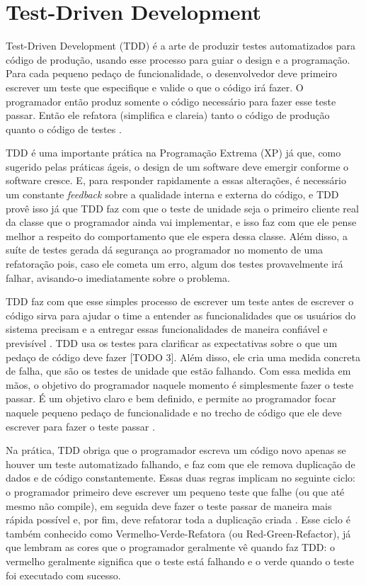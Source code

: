\chapter{Test-Driven Development}
\label{cap:tdd}

Test-Driven Development (TDD) é a arte de produzir testes automatizados para código de produção, usando
esse processo para guiar o design e a programação. Para cada pequeno pedaço de funcionalidade, o desenvolvedor
deve primeiro escrever um teste que especifique e valide o que o código irá fazer. O programador então produz
somente o código necessário para fazer esse teste passar. Então ele refatora (simplifica e clareia) tanto o
código de produção quanto o código de testes \cite{agilealliance-tdd} \cite{tdd-taxonomy}.

TDD é uma importante prática na Programação Extrema (XP) \cite{XPExplained} já que, como sugerido pelas práticas
ágeis, o design de um software deve emergir conforme o software cresce. E, para responder rapidamente a essas
alterações, é necessário um constante \textit{feedback} sobre a qualidade interna e externa do código, e TDD
provê isso já que TDD faz com que o teste de unidade seja o primeiro cliente real da classe que o programador ainda
vai implementar, e isso faz com que ele pense melhor a respeito do comportamento que ele espera dessa classe. Além disso,
a suíte de testes gerada dá segurança ao programador no momento de uma refatoração pois, caso ele cometa um erro,
algum dos testes provavelmente irá falhar, avisando-o imediatamente sobre o problema.

TDD faz com que esse simples processo de escrever um teste antes de escrever o código
sirva para ajudar o time a entender as funcionalidades que os usuários do sistema precisam e 
a entregar essas funcionalidades de maneira confiável e previsível \cite{GOOS}. TDD usa os testes para clarificar as expectativas
sobre o que um pedaço de código deve fazer [TODO 3]. Além disso, ele cria uma medida concreta de falha, que são os testes de 
unidade que estão falhando. Com essa medida em mãos, o objetivo do programador naquele momento é simplesmente fazer o teste passar. É um
objetivo claro e bem definido, e permite ao programador focar naquele pequeno pedaço de funcionalidade e no trecho de código que ele 
deve escrever para fazer o teste passar \cite{TDDByExample}. 

Na prática, TDD obriga que o programador escreva
um código novo apenas se houver um teste automatizado falhando, e faz com que ele remova duplicação de dados e de código constantemente. 
Essas duas regras implicam no seguinte ciclo: o programador primeiro deve escrever um pequeno teste que falhe (ou que até mesmo não compile), 
em seguida deve fazer o teste passar de maneira mais rápida possível e, por fim, deve refatorar toda a duplicação criada \cite{TDDByExample}. 
Esse ciclo é também conhecido como Vermelho-Verde-Refatora (ou Red-Green-Refactor), já que lembram as cores que o programador geralmente 
vê quando faz TDD: o vermelho geralmente significa que o teste está falhando e o verde quando o teste foi executado com sucesso. 

